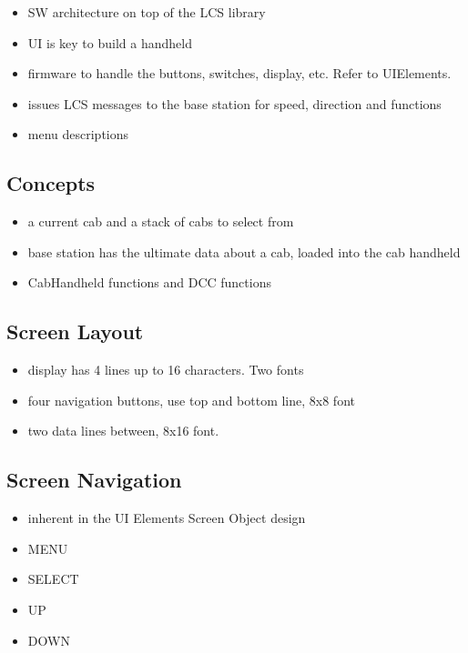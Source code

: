 \begin{itemize}
\item SW architecture on top of the LCS library
\item UI is key to build a handheld
\item firmware to handle the buttons, switches, display, etc. Refer to UIElements.
\item issues LCS messages to the base station for speed, direction and functions
\item menu descriptions
\end{itemize}

\subsection{Concepts}

\begin{itemize}
\item a current cab and a stack of cabs to select from
\item base station has the ultimate data about a cab, loaded into the cab handheld
\item CabHandheld functions and DCC functions
\end{itemize}

\subsection{Screen Layout}

\begin{itemize}
\item display has 4 lines up to 16 characters. Two fonts
\item four navigation buttons, use top and bottom line, 8x8 font
\item two data lines between, 8x16 font.
\end{itemize}

\subsection{Screen Navigation}

\begin{itemize}
\item inherent in the UI Elements Screen Object design
\item MENU
\item SELECT
\item UP
\item DOWN
\end{itemize}

